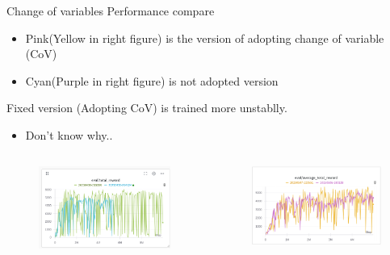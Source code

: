 \documentclass[8pt]{beamer}
\begin{document}
\begin{frame}{Change of variables}
    Performance compare
    \begin{itemize}
        \item Pink(Yellow in right figure) is the version of adopting change of variable (CoV)
        \item Cyan(Purple in right figure) is not adopted version
    \end{itemize}
    Fixed version (Adopting CoV) is trained more unstablly.
    \begin{itemize}
        \item Don't know why..
    \end{itemize}

    \begin{columns}
        \begin{column}{0.5\textwidth}
            \begin{figure}
                \centering
                \includegraphics[width=1.0\textwidth]{CovReturns.png}
            \end{figure}
        \end{column}
        \begin{column}{0.5\textwidth}
            \begin{figure}
                \includegraphics[width=1.0\textwidth]{CoVReturns1.png}
            \end{figure}
        \end{column}
    \end{columns}

\end{frame}
\end{document}
